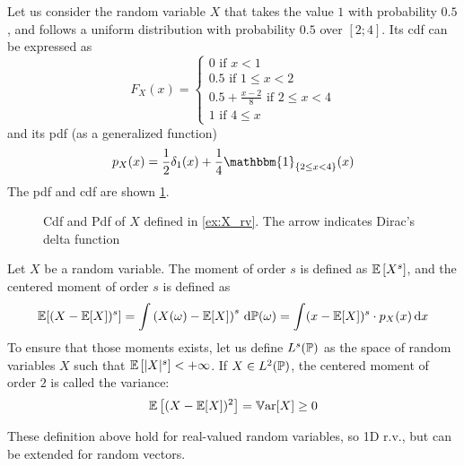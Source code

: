 \documentclass[../../Main_ManuscritThese.tex]{subfiles}
\newcommand\imgpath{/home/victor/acadwriting/Manuscrit/Text/Chapter2/img/}
\begin{document}
\begin{example}
  \label{ex:X_rv}
  Let us consider the random variable $X$ that takes the value $1$ with probability $0.5$, and follows a uniform distribution with probability $0.5$ over $[2;4]$. Its cdf can be expressed as
  \begin{equation}
    F_X(x) =
    \begin{cases}
      0 \text{ if } x < 1 \\
      0.5 \text{ if } 1 \leq x < 2 \\
      0.5 + \frac{x-2}{8} \text{ if } 2 \leq x < 4 \\
      1 \text{ if } 4 \leq x
    \end{cases}
  \end{equation}
  and its pdf (as a generalized function)
  \begin{equation}
    p_X(x) = \frac{1}{2}\delta_{1}(x) + \frac{1}{4}\mathbbm{1}_{\{2\leq x < 4\}}(x) 
  \end{equation}
  The pdf and cdf are shown \cref{fig:example_pdf_cdf}.
\end{example}
\begin{figure}[!h]
  \centering
  
  \caption{Cdf and Pdf of $X$ defined in \cref{ex:X_rv}. The arrow indicates Dirac's delta function}
  \label{fig:example_pdf_cdf}
\end{figure}

\begin{definition}
  Let $X$ be a random variable.
  The moment of order $s$ is defined as $\mathbb{E}\left[X^s\right]$, and the centered moment of order $s$ is defined as
  \begin{equation}
    \mathbb{E}[(X-\mathbb{E}[X])^s]=\int \left(X(\omega) - \mathbb{E}[X]\right)^s \,\mathrm{d}\mathbb{P}(\omega) = \int (x-\mathbb{E}[X])^s\cdot p_X(x)\,\mathrm{d}x
  \end{equation}
  To ensure that those moments exists, let us define $L^s(\mathbb{P})$ as the space of random variables $X$ such that $\mathbb{E}\left[\lvert X \rvert^s\right] < +\infty$.
  If $X\in L^2(\mathbb{P})$, the centered moment of order $2$ is called the variance:
  \begin{equation}
    \label{eq:variance_def}
    \mathbb{E}\left[(X-\mathbb{E}[X])^2 \right] = \mathbb{V}\mathrm{ar}[X] \geq 0
  \end{equation}
\end{definition}

These definition above hold for real-valued random variables, so 1D r.v., but can be extended for random vectors.
\end{document}
